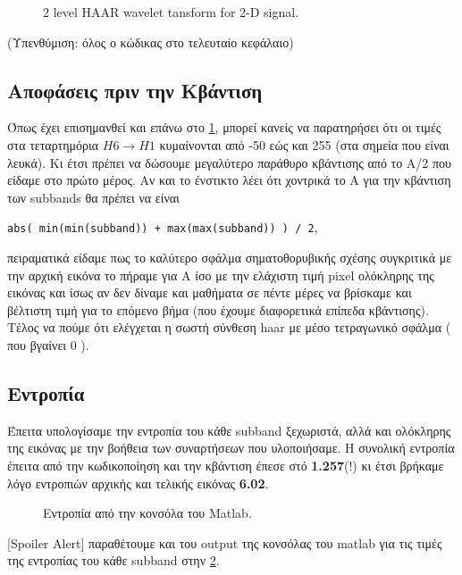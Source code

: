 \documentclass[11pt]{scrartcl} %
\begin{document}
\begin{figure}[h]
    \centering
    \caption{2 level HAAR wavelet tansform for 2-D signal.}
    \label{c1}
\end{figure}

(Υπενθύμιση: όλος ο κώδικας στο τελευταίο κεφάλαιο)

\subsection{Αποφάσεις πριν την Κβάντιση}
Όπως έχει επισημανθεί και επάνω στο \ref{c1}, μπορεί κανείς να παρατηρήσει ότι οι τιμές στα τεταρτημόρια $H6 \rightarrow H1$ κυμαίνονται από -50 εώς και 255 (στα σημεία που είναι λευκά).
Κι έτσι πρέπει να δώσουμε μεγαλύτερο παράθυρο κβάντισης από το Α/2 που είδαμε στο πρώτο μέρος. Αν και το ένστικτο λέει ότι χοντρικά το Α για την κβάντιση των subbands θα πρέπει να είναι

\lstinline{abs( min(min(subband)) + max(max(subband)) ) / 2},

πειραματικά είδαμε πως το καλύτερο σφάλμα σηματοθορυβικής σχέσης συγκριτικά με την αρχική εικόνα το πήραμε για Α ίσο με την
ελάχιστη τιμή pixel ολόκληρης της εικόνας και ίσως αν δεν δίναμε και μαθήματα σε πέντε μέρες να βρίσκαμε και βέλτιστη τιμή για το επόμενο βήμα (που έχουμε διαφορετικά επίπεδα κβάντισης).
Τέλος να πούμε ότι ελέγχεται η σωστή σύνθεση haar με μέσο τετραγωνικό σφάλμα ( που βγαίνει 0 ).

\subsection{Εντροπία}
Έπειτα υπολογίσαμε την εντροπία του κάθε subband ξεχωριστά, αλλά και ολόκληρης της εικόνας με την βοήθεια των συναρτήσεων που υλοποιήσαμε. Η συνολική εντροπία έπειτα από την κωδικοποίηση
και την κβάντιση έπεσε στό \textbf{1.257}(!) κι έτσι βρήκαμε λόγο εντροπιών αρχικής και τελικής εικόνας \textbf{6.02}.

\begin{figure}[h]
    \centering
    \caption{Εντροπία από την κονσόλα του Matlab.}
    \label{ent}
\end{figure}

[Spoiler Alert] παραθέτουμε και του output της κονσόλας του matlab για τις τιμές της εντροπίας του κάθε subband στην \ref{ent}.
\end{document}
